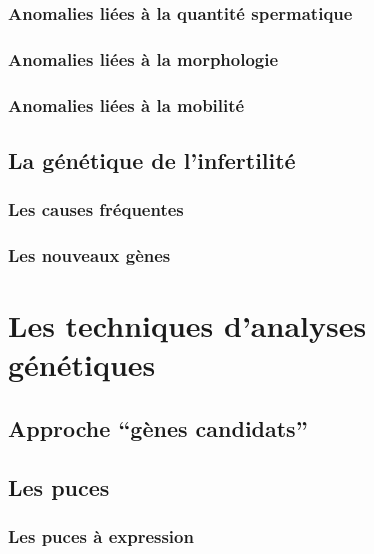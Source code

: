 \documentclass[12pt,twoside]{ugathesis}
\begin{document}
\subsubsection{Anomalies liées à la quantité
spermatique}\label{infquant}

\subsubsection{Anomalies liées à la
morphologie}\label{anomalies-liees-a-la-morphologie}

\subsubsection{Anomalies liées à la
mobilité}\label{anomalies-liees-a-la-mobilite}

\subsection{La génétique de
l'infertilité}\label{la-genetique-de-linfertilite}

\subsubsection{Les causes fréquentes}\label{les-causes-frequentes}

\subsubsection{Les nouveaux gènes}\label{les-nouveaux-genes}

\section{Les techniques d'analyses
génétiques}\label{les-techniques-danalyses-genetiques}

\subsection{\texorpdfstring{Approche ``gènes
candidats''}{Approche gènes candidats}}\label{approche-genes-candidats}

\subsection{Les puces}\label{les-puces}

\subsubsection{Les puces à expression}\label{les-puces-a-expression}
\end{document}
